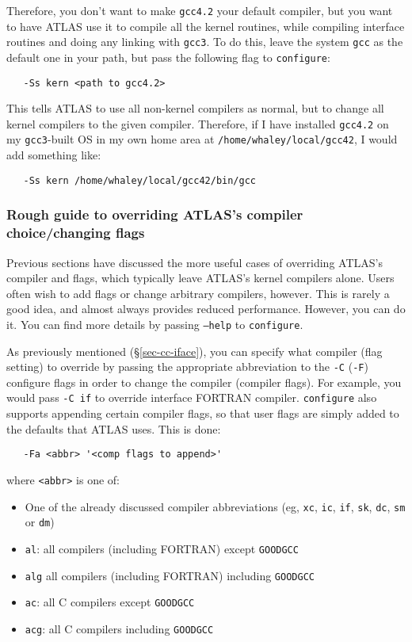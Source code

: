 \documentclass[11pt]{article}
\begin{document}
Therefore, you don't want to make {\tt gcc4.2} your default compiler, but
you want to have ATLAS use it to compile all the kernel routines, while
compiling interface routines and doing any linking with {\tt gcc3}.  To
do this, leave the system {\tt gcc} as the default one in your path, but
pass the following flag to {\tt configure}:
\vspace*{-0.1in}
\begin{verbatim}
   -Ss kern <path to gcc4.2>
\end{verbatim}

This tells ATLAS to use all non-kernel compilers as normal, but to change
all kernel compilers to the given compiler.  Therefore, if I have installed
{\tt gcc4.2} on my {\tt gcc3}-built OS in my own home area at
{\tt /home/whaley/local/gcc42}, I would add something like:
\vspace*{-0.1in}
\begin{verbatim}
   -Ss kern /home/whaley/local/gcc42/bin/gcc
\end{verbatim}

\subsubsection{Rough guide to overriding ATLAS's compiler choice/changing flags}
\label{sec-cc-override}
Previous sections have discussed the more useful cases of overriding
ATLAS's compiler and flags, which typically leave ATLAS's kernel compilers
alone.  Users often wish to add flags or change arbitrary compilers, however.
This is rarely a good idea, and almost always provides reduced performance.
However, you can do it.  You can find more details by passing 
{\tt --help} to {\tt configure}.  

As previously mentioned (\S\ref{sec-cc-iface}), you can specify what compiler
(flag setting) to
override by passing the appropriate abbreviation to the {\tt -C} ({\tt -F})
configure flags in order to change the compiler (compiler flags). For
example, you would pass {\tt -C if} to override interface FORTRAN compiler.
{\tt configure} also supports appending certain compiler flags, so that user
flags are simply added to the defaults that ATLAS uses.  This is done:
\vspace*{-0.1in}
\begin{verbatim}
   -Fa <abbr> '<comp flags to append>'
\end{verbatim}
where \verb|<abbr>| is one of:
\begin{itemize}
\item One of the already discussed compiler abbreviations 
      (eg, {\tt xc}, {\tt ic}, {\tt if}, {\tt sk}, {\tt dc}, {\tt sm} 
       or {\tt dm})
\item {\tt al}: all compilers (including FORTRAN) except {\tt GOODGCC}
\item {\tt alg} all compilers (including FORTRAN) including {\tt GOODGCC}
\item {\tt  ac}: all C compilers except {\tt GOODGCC}
\item {\tt acg}: all C compilers including {\tt GOODGCC}
\end{itemize}
\end{document}
